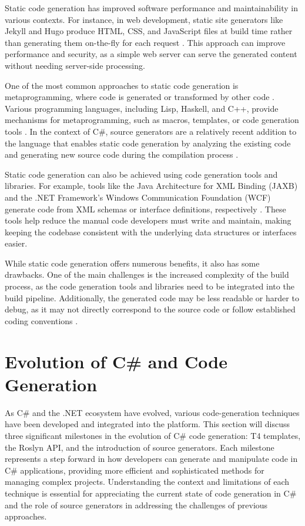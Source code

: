 Static code generation has improved software performance and maintainability in various contexts. For instance, in web development, static site generators like Jekyll and Hugo produce HTML, CSS, and JavaScript files at build time rather than generating them on-the-fly for each request \cite{Biilmann2015}. This approach can improve performance and security, as a simple web server can serve the generated content without needing server-side processing.

One of the most common approaches to static code generation is metaprogramming, where code is generated or transformed by other code \cite{Cordy1992}. Various programming languages, including Lisp, Haskell, and C++, provide mechanisms for metaprogramming, such as macros, templates, or code generation tools \cite{Cordy1992}. In the context of C\#, source generators are a relatively recent addition to the language that enables static code generation by analyzing the existing code and generating new source code during the compilation process \cite{Microsoft2022SourceGenerators}.

Static code generation can also be achieved using code generation tools and libraries. For example, tools like the Java Architecture for XML Binding (JAXB) and the .NET Framework's Windows Communication Foundation (WCF) generate code from XML schemas or interface definitions, respectively \cite{Vogel2023, Microsoft2021WhatLearn}. These tools help reduce the manual code developers must write and maintain, making keeping the codebase consistent with the underlying data structures or interfaces easier.

While static code generation offers numerous benefits, it also has some drawbacks. One of the main challenges is the increased complexity of the build process, as the code generation tools and libraries need to be integrated into the build pipeline. Additionally, the generated code may be less readable or harder to debug, as it may not directly correspond to the source code or follow established coding conventions \cite{Chiba2000}.


\section{Evolution of C\# and Code Generation}

As C\# and the .NET ecosystem have evolved, various code-generation techniques have been developed and integrated into the platform. This section will discuss three significant milestones in the evolution of C\# code generation: T4 templates, the Roslyn API, and the introduction of source generators. Each milestone represents a step forward in how developers can generate and manipulate code in C\# applications, providing more efficient and sophisticated methods for managing complex projects. Understanding the context and limitations of each technique is essential for appreciating the current state of code generation in C\# and the role of source generators in addressing the challenges of previous approaches.

